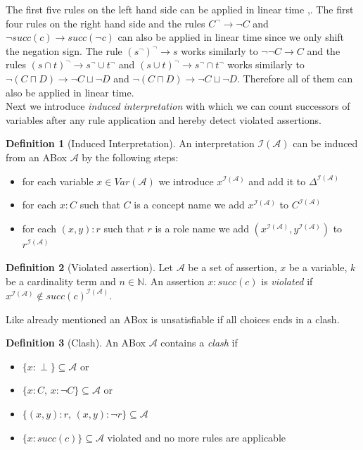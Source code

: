 \documentclass{book}
\theoremstyle{break}
\theoremstyle{definition}
\newtheorem{mydef}{Definition}
\begin{document}
The first five rules on the left hand side can be applied in linear time \cite{1},\cite{6}. The first four rules on the right hand side and the rules $C^\neg\rightarrow \neg C$ and $\neg succ(c)\rightarrow succ(\neg c)$ can also be applied in linear time since we only shift the negation sign. The rule $(s^\neg)^\neg\rightarrow s$ works similarly to $\neg\neg C\rightarrow C$ and the rules $(s\cap t)^\neg\rightarrow s^\neg\cup t^\neg$ and $(s\cup t)^\neg\rightarrow s^\neg \cap t^\neg$ works similarly to $\neg(C\sqcap D)\rightarrow \neg C\sqcup \neg D$ and $\neg(C\sqcap D)\rightarrow \neg C\sqcup \neg D$. Therefore all of them can also be applied in linear time.\\
Next we introduce \textit{induced interpretation} with which we can count successors of variables after any rule application and hereby detect violated assertions.
\begin{mydef}[Induced Interpretation]
An interpretation $\mathcal{I}(\mathcal{A})$ can be induced from an ABox $\mathcal{A}$ by the following steps:
\begin{itemize}
\item for each variable $x\in Var(\mathcal{A})$ we introduce $x^{\mathcal{I}(\mathcal{A})}$ and add it to $\Delta^{\mathcal{I}(\mathcal{A})}$
\item for each $x:C$ such that $C$ is a concept name we add $x^{\mathcal{I}(\mathcal{A})}$ to $C^{\mathcal{I}(\mathcal{A})}$
\item for each $(x,y):r$ such that $r$ is a role name we add $(x^{\mathcal{I}(\mathcal{A})},y^{\mathcal{I}(\mathcal{A})})$ to $r^{\mathcal{I}(\mathcal{A})}$
\end{itemize}
\end{mydef}
\begin{mydef}[Violated assertion]
Let $\mathcal{A}$ be a set of assertion, $x$ be a variable, $k$ be a cardinality term and $n\in\mathbb{N}$. An assertion $x:succ(c)$ is \textit{violated} if $x^{\mathcal{I}(\mathcal{A})}\notin succ(c)^{\mathcal{I}(\mathcal{A})}$.
\end{mydef}
Like already mentioned an ABox is unsatisfiable if all choices ends in a clash.
\begin{mydef}[Clash]
An ABox $\mathcal{A}$ contains a \textit{clash} if
\begin{itemize}
\item $\{x:\perp\}\subseteq \mathcal{A}$ or
\item $\{x:C,\,x:\neg C\}\subseteq \mathcal{A}$ or
\item $\{(x,y):r,\,(x,y):\neg r\}\subseteq \mathcal{A}$
\item $\{x:succ(c)\}\subseteq \mathcal{A}$ violated and no more rules are applicable
\end{itemize}
\end{mydef}
\end{document}
